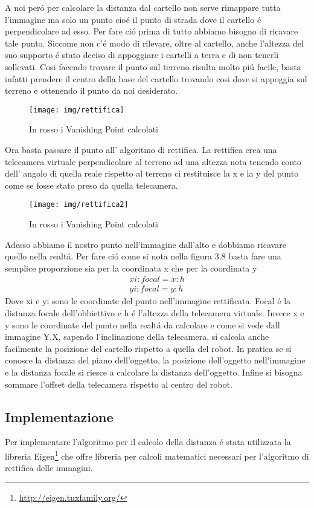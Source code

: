 		A noi per\'o per calcolare la distanza dal cartello non serve rimappare tutta l'immagine ma solo un punto cio\'e il punto di strada dove il cartello \'e perpendicolare ad esso. Per fare ci\'o prima di tutto abbiamo bisogno di ricavare tale punto. Siccome non c'\'e modo di rilevare, oltre al cartello, anche l'altezza del suo supporto \'e stato deciso di appoggiare i cartelli a terra e di non tenerli sollevati. Cosi facendo trovare il punto sul terreno risulta molto pi\'u facile, basta infatti prendere il centro della base del cartello trovando cosi dove si appoggia sul terreno e ottenendo il punto da noi desiderato.
		\begin{figure}[!ht]
			\centering
			\texttt{[image: img/rettifica]}
			\caption{In rosso i Vanishing Point calcolati}
		\end{figure}
		Ora basta passare il punto all' algoritmo di rettifica. La rettifica crea una telecamera virtuale perpendicolare al terreno ad una altezza nota tenendo conto dell' angolo di quella reale  rispetto al terreno ci restituisce la x e la y del punto come se fosse stato preso da quella telecamera.

		\begin{figure}[!ht]
			\centering
			\texttt{[image: img/rettifica2]}
			\caption{In rosso i Vanishing Point calcolati}
		\end{figure}
		Adesso abbiamo il nostro punto nell'immagine dall'alto e dobbiamo ricavare quello nella realt\'a. Per fare ci\'o come si nota nella figura 3.8 basta fare una semplice proporzione sia per la coordinata x che per la coordinata y
		\begin{align*}
			xi : focal = x : h
			\\
			yi : focal = y : h
		\end{align*}
		Dove xi e yi sono le coordinate del punto nell'immagine rettificata. Focal \'e la distanza focale dell'obbiettivo e h \'e l'altezza della telecamera virtuale. Invece x e y sono le coordinate del punto nella realt\'a da calcolare e come si vede dall immagine Y.X, sapendo l'inclinazione della telecamera, si calcola anche facilmente la posizione del cartello rispetto a quella del robot.
		In pratica se si conosce la distanza del piano dell'oggetto, la posizione dell'oggetto nell'immagine e la distanza focale si riesce a calcolare la distanza dell'oggetto. Infine si bisogna sommare l'offset della telecamera rispetto al centro del robot.

	\subsection{Implementazione}
		Per implementare l'algoritmo per il calcolo della distanza \'e stata utilizzata la libreria Eigen\footnote{\url{ http://eigen.tuxfamily.org/}} che offre libreria per calcoli matematici necessari per l'algoritmo di rettifica delle immagini.

